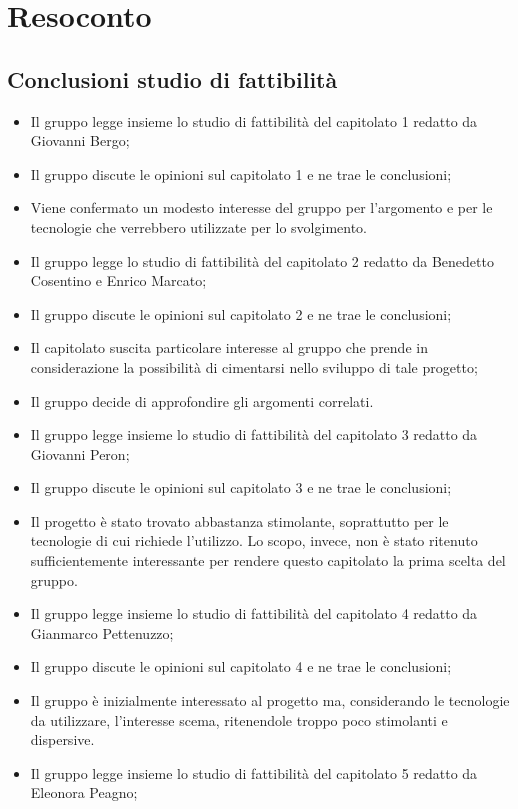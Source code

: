 \documentclass[11pt,a4paper]{article}
\begin{document}
	\section{Resoconto}	
	\subsection{Conclusioni studio di fattibilità}
	\begin{itemize}
	\item Il gruppo legge insieme lo studio di fattibilità del capitolato 1 redatto da Giovanni Bergo;
	\item Il gruppo discute le opinioni sul capitolato 1 e ne trae le conclusioni;
	\item Viene confermato un modesto interesse del gruppo per l’argomento e per le tecnologie che verrebbero utilizzate per lo svolgimento.
	\item Il gruppo legge lo studio di fattibilità del capitolato 2 redatto da Benedetto Cosentino e Enrico Marcato;
	\item Il gruppo discute le opinioni sul capitolato 2 e ne trae le conclusioni;
	\item Il capitolato suscita particolare interesse al gruppo che prende in considerazione la possibilità di cimentarsi nello sviluppo di tale progetto;
	\item Il gruppo decide di approfondire gli argomenti correlati.
	\item Il gruppo legge insieme lo studio di fattibilità del capitolato 3 redatto da Giovanni Peron;
	\item Il gruppo discute le opinioni sul capitolato 3 e ne trae le conclusioni;
	\item Il progetto è stato trovato abbastanza stimolante, soprattutto per le tecnologie di cui richiede l’utilizzo. Lo scopo, invece, non è stato ritenuto sufficientemente interessante per rendere questo capitolato la prima scelta del gruppo. 
	\item Il gruppo legge insieme lo studio di fattibilità del capitolato 4 redatto da Gianmarco Pettenuzzo;
	\item Il gruppo discute le opinioni sul capitolato 4 e ne trae le conclusioni;
	\item Il gruppo è inizialmente interessato al progetto ma, considerando le tecnologie da utilizzare, l’interesse scema, ritenendole troppo poco stimolanti e dispersive.
	\item Il gruppo legge insieme lo studio di fattibilità del capitolato 5 redatto da Eleonora Peagno;

\end{itemize}
\end{document}
